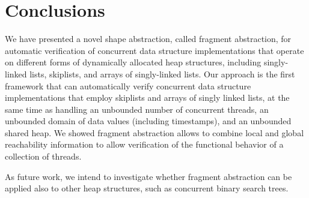 \section{Conclusions}
\label{sec:conclusions}
We have presented a novel shape abstraction, called fragment abstraction,
for automatic verification of
concurrent data structure implementations that operate on different forms of
dynamically allocated heap structures, including singly-linked lists, skiplists,
and arrays of singly-linked lists.
Our approach is the first framework that
can automatically verify concurrent data structure implementations that employ
skiplists and arrays of singly linked lists,
at the same time as handling an unbounded
number of concurrent threads, an unbounded domain of data values
(including timestamps), and an unbounded shared heap.
We showed fragment abstraction allows to combine local and global reachability
information to allow verification of the functional behavior
of a collection of threads.

As future work, we intend to investigate whether fragment abstraction can be
applied also to other heap structures, such as concurrent binary search trees.
%

